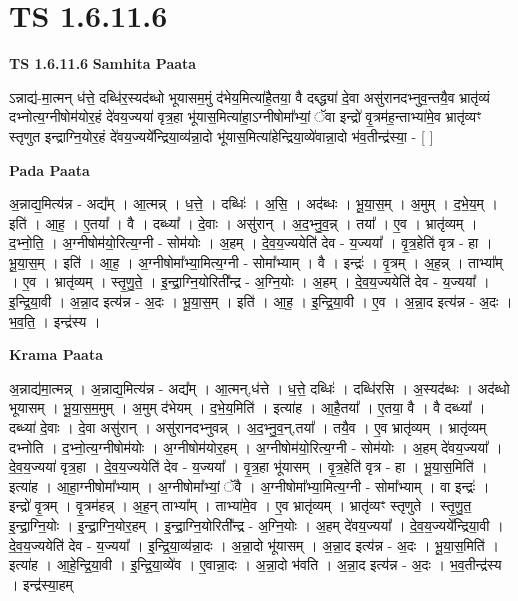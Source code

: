 \documentclass[17pt]{extarticle}
\begin{document}
\section{ TS 1.6.11.6 }

\textbf{TS 1.6.11.6 } \newline
\textbf{Samhita Paata} \newline

ऽन्नाद्य॑-मा॒त्मन् ध॑त्ते॒ दब्धि॑र॒स्यद॑ब्धो भूयासम॒मुं द॑भेय॒मित्या॑है॒तया॒ वै दब्द्ध्या॑ दे॒वा असु॑रानदभ्नुव॒न्तयै॒व भ्रातृ॑व्यं दभ्नोत्य॒ग्नीषोम॑योर॒हं दे॑वय॒ज्यया॑ वृत्र॒हा भू॑यास॒मित्या॑हा॒ऽग्नीषोमा᳚भ्यां॒ ॅवा इन्द्रो॑ वृ॒त्रम॑ह॒न्ताभ्या॑मे॒व भ्रातृ॑व्यꣳ स्तृणुत इन्द्राग्नि॒योर॒हं दे॑वय॒ज्यये᳚न्द्रिया॒व्य॑न्ना॒दो भू॑यास॒मित्या॑हेन्द्रिया॒व्ये॑वान्ना॒दो भ॑व॒तीन्द्र॑स्या॒ - [ ] \newline

\textbf{Pada Paata} \newline

अ॒न्नाद्य॒मित्य॑न्न - अद्य᳚म् । आ॒त्मन्न् । ध॒त्ते॒ । दब्धिः॑ । अ॒सि॒ । अद॑ब्धः । भू॒या॒स॒म् । अ॒मुम् । द॒भे॒य॒म् । इति॑ । आ॒ह॒ । ए॒तया᳚ । वै । दब्ध्या᳚ । दे॒वाः । असु॑रान् । अ॒द॒भ्नु॒व॒॒न्न् । तया᳚ । ए॒व । भ्रातृ॑व्यम् । द॒भ्नो॒ति॒ । अ॒ग्नीषोम॑यो॒रित्य॒ग्नी - सोम॑योः । अ॒हम् । दे॒व॒य॒ज्ययेति॑ देव - य॒ज्यया᳚ । वृ॒त्र॒हेति॑ वृत्र - हा । भू॒या॒स॒म् । इति॑ । आ॒ह॒ । अ॒ग्नीषोमा᳚भ्या॒मित्य॒ग्नी - सोमा᳚भ्याम् । वै । इन्द्रः॑ । वृ॒त्रम् । अ॒ह॒न्न् । ताभ्या᳚म् । ए॒व । भ्रातृ॑व्यम् । स्तृ॒णु॒ते॒ । इ॒न्द्रा॒ग्नि॒योरिती᳚न्द्र - अ॒ग्नि॒योः । अ॒हम् । दे॒व॒य॒ज्ययेति॑ देव - य॒ज्यया᳚ । इ॒न्द्रि॒या॒वी । अ॒न्ना॒द इत्य॑न्न - अ॒दः । भू॒या॒स॒म् । इति॑ । आ॒ह॒ । इ॒न्द्रि॒या॒वी । ए॒व । अ॒न्ना॒द इत्य॑न्न - अ॒दः । भ॒व॒ति॒ । इन्द्र॑स्य ।  \newline


\textbf{Krama Paata} \newline

अ॒न्नाद्य॑मा॒त्मन्न् । अ॒न्नाद्य॒मित्य॑न्न - अद्य᳚म् । आ॒त्मन्,ध॑त्ते । ध॒त्ते॒ दब्धिः॑ । दब्धि॑रसि । अ॒स्यद॑ब्धः । अद॑ब्धो भूयासम् । भू॒या॒स॒म॒मुम् । अ॒मुम् द॑भेयम् । द॒भे॒य॒मिति॑ । इत्या॑ह । आ॒है॒तया᳚ । ए॒तया॒ वै । वै दब्ध्या᳚ । दब्ध्या॑ दे॒वाः । दे॒वा असु॑रान् । असु॑रानदभ्नुवन्न् । अ॒द॒भ्नु॒व॒न्,तया᳚ । तयै॒व । ए॒व भ्रातृ॑व्यम् । भ्रातृ॑व्यम् दभ्नोति । द॒भ्नो॒त्य॒ग्नीषोम॑योः । अ॒ग्नीषोम॑योर॒हम् । अ॒ग्नीषोम॑यो॒रित्य॒ग्नी - सोम॑योः । अ॒हम् दे॑वय॒ज्यया᳚ । दे॒व॒य॒ज्यया॑ वृत्र॒हा । दे॒व॒य॒ज्ययेति॑ देव - य॒ज्यया᳚ । वृ॒त्र॒हा भू॑यासम् । वृ॒त्र॒हेति॑ वृत्र - हा । भू॒या॒स॒मिति॑ । इत्या॑ह । आ॒हा॒ग्नीषोमा᳚भ्याम् । अ॒ग्नीषोमा᳚भ्यां॒ ॅवै । अ॒ग्नीषोमा᳚भ्या॒मित्य॒ग्नी - सोमा᳚भ्याम् । वा इन्द्रः॑ । इन्द्रो॑ वृ॒त्रम् । वृ॒त्रम॑हन्न् । अ॒ह॒न् ताभ्या᳚म् । ताभ्या॑मे॒व । ए॒व भ्रातृ॑व्यम् । भ्रातृ॑व्यꣳ स्तृणुते । स्तृ॒णु॒त॒ इ॒न्द्रा॒ग्नि॒योः । इ॒न्द्रा॒ग्नि॒योर॒हम् । इ॒न्द्रा॒ग्नि॒योरिती᳚न्द्र - अ॒ग्नि॒योः । अ॒हम् दे॑वय॒ज्यया᳚ । दे॒व॒य॒ज्यये᳚न्द्रिया॒वी । दे॒व॒य॒ज्ययेति॑ देव - य॒ज्यया᳚ । इ॒न्द्रि॒या॒व्य॑न्ना॒दः । अ॒न्ना॒दो भू॑यासम् । अ॒न्ना॒द इत्य॑न्न - अ॒दः । भू॒या॒स॒मिति॑ । इत्या॑ह । आ॒हे॒न्द्रि॒या॒वी । इ॒न्द्रि॒या॒व्ये॑व । ए॒वान्ना॒दः । अ॒न्ना॒दो भ॑वति । अ॒न्ना॒द इत्य॑न्न - अ॒दः । भ॒व॒तीन्द्र॑स्य । इन्द्र॑स्या॒हम् \newline
\end{document}
